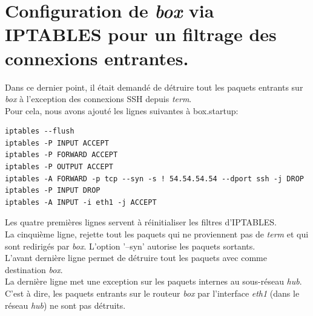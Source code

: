 \documentclass[12pt,a4paper,utf8x]{report}
\begin{document}
\section[Filtrage sur \emph{box} des connexions entrantes]{Configuration de \emph{box} via IPTABLES pour un filtrage des connexions entrantes.}
Dans ce dernier point, il était demandé de détruire tout les paquets entrants sur \emph{box} à l'exception des connexions SSH depuis \emph{term}.\\
Pour cela, nous avons ajouté les lignes suivantes à box.startup:
\begin{verbatim}
iptables --flush
iptables -P INPUT ACCEPT
iptables -P FORWARD ACCEPT
iptables -P OUTPUT ACCEPT
iptables -A FORWARD -p tcp --syn -s ! 54.54.54.54 --dport ssh -j DROP
iptables -P INPUT DROP
iptables -A INPUT -i eth1 -j ACCEPT
\end{verbatim}
Les quatre premières lignes servent à réinitialiser les filtres d'IPTABLES.\\
La cinquième ligne, rejette tout les paquets qui ne proviennent pas de \emph{term} et qui sont redirigés par \emph{box}. L'option '--syn' autorise les paquets sortants.\\
L'avant dernière ligne permet de détruire tout les paquets avec comme destination \emph{box}.\\
La dernière ligne met une exception sur les paquets internes au sous-réseau \emph{hub}. C'est à dire, les paquets entrants sur le routeur \emph{box} par l'interface \emph{eth1} (dans le réseau \emph{hub}) ne sont pas détruits.\\
\end{document}
